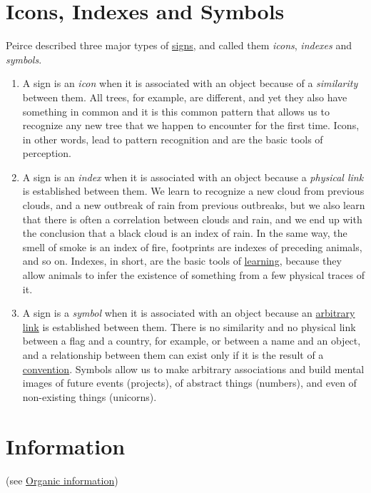 \documentclass[12pt]{article}
\begin{document}
\hypertarget{icons_indexes_and_symbols}{}
\section{Icons, Indexes and Symbols}
Peirce described three major types of \hyperlink{signs}{signs}, and called them \textit{icons}, \textit{indexes} and \textit{symbols}.
\begin{enumerate}
\item A sign is an \textit{icon} when it is associated with an object because of a \textit{similarity} between them. All trees, for example, are different, and yet they also have something in common and it is this common pattern that allows us to recognize any new tree that we happen to encounter for the first time. Icons, in other words, lead to pattern recognition and are the basic tools of perception. 

\item A sign is an \textit{index} when it is associated with an object because a \textit{physical link} is established between them. We learn to recognize a new cloud from previous clouds, and a new outbreak of rain from previous outbreaks, but we also learn that there is often a correlation between clouds and rain, and we end up with the conclusion that a black cloud is an index of rain. In the same way, the smell of smoke is an index of fire, footprints are indexes of preceding animals, and so on. Indexes, in short, are the basic tools of \hyperlink{learning}{learning}, because they allow animals to infer the existence of something from a few physical traces of it.

\item A sign is a \textit{symbol} when it is associated with an object because an \hyperlink{arbitrariness}{arbitrary link} is established between them. There is no similarity and no physical link between a flag and a country, for example, or between a name and an object, and a relationship between them can exist only if it is the result of a \hyperlink{convention}{convention}. Symbols allow us to make arbitrary associations and build mental images of future events (projects), of abstract things (numbers), and even of non-existing things (unicorns). 
\end{enumerate}


\hypertarget{information}{}
\section{Information} (see \hyperlink{organic_information}{Organic information}) 
\end{document}
